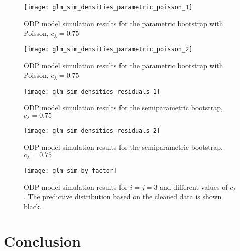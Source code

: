 \documentclass[a4paper]{book}
\begin{document}
\begin{landscape}
  \begin{figure}
    \centering
    \texttt{[image: glm\_sim\_densities\_parametric\_poisson\_1]}
    \caption{ODP model simulation results for the parametric bootstrap with Poisson, $c_\lambda = 0.75$}
    \label{fig:glm-sim-param-pois}
  \end{figure}
\end{landscape}

\begin{landscape}
  \begin{figure}
    \ContinuedFloat
    \captionsetup{list=off,format=cont}
    \centering
    \texttt{[image: glm\_sim\_densities\_parametric\_poisson\_2]}
    \caption{ODP model simulation results for the parametric bootstrap with Poisson, $c_\lambda = 0.75$}
  \end{figure}
\end{landscape}

\begin{landscape}
  \begin{figure}
    \centering
    \texttt{[image: glm\_sim\_densities\_residuals\_1]}
    \caption{ODP model simulation results for the semiparametric bootstrap, $c_\lambda = 0.75$}
    \label{fig:glm-sim-semiparam}
  \end{figure}
\end{landscape}

\begin{landscape}
  \begin{figure}
    \ContinuedFloat
    \captionsetup{list=off,format=cont}
    \centering
    \texttt{[image: glm\_sim\_densities\_residuals\_2]}
    \caption{ODP model simulation results for the semiparametric bootstrap, $c_\lambda = 0.75$}
  \end{figure}
\end{landscape}

\begin{landscape}
  \begin{figure}
    \centering
    \texttt{[image: glm\_sim\_by\_factor]}
    \caption{ODP model simulation results for $i = j = 3$ and different values of $c_\lambda$. The predictive distribution based on the cleaned data is shown black.}
    \label{fig:glm-sim-by-factor}
  \end{figure}
\end{landscape}

\restoregeometry

\backmatter%

\chapter{Conclusion} \label{conclusion}

\printbibliography%
\end{document}
